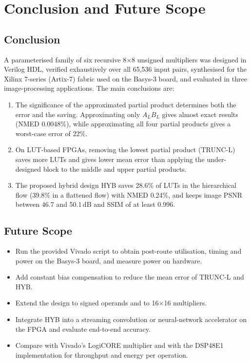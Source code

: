 \documentclass[12pt,a4paper,oneside]{report}
\begin{document}
\chapter{Conclusion and Future Scope}

\section{Conclusion}
A parameterised family of six recursive 8$\times$8 unsigned multipliers was designed in Verilog HDL, verified exhaustively over all 65{,}536 input pairs, synthesised for the Xilinx 7-series (Artix-7) fabric used on the Basys-3 board, and evaluated in three image-processing applications. The main conclusions are:
\begin{enumerate}
\item The significance of the approximated partial product determines both the error and the saving. Approximating only $A_LB_L$ gives almost exact results (NMED 0.0048\%), while approximating all four partial products gives a worst-case error of 22\%.
\item On LUT-based FPGAs, removing the lowest partial product (TRUNC-L) saves more LUTs and gives lower mean error than applying the under-designed block to the middle and upper partial products.
\item The proposed hybrid design HYB saves 28.6\% of LUTs in the hierarchical flow (39.8\% in a flattened flow) with NMED 0.24\%, and keeps image PSNR between 46.7 and 50.1\,dB and SSIM of at least 0.996.
\end{enumerate}

\section{Future Scope}
\begin{itemize}
\item Run the provided Vivado script to obtain post-route utilisation, timing and power on the Basys-3 board, and measure power on hardware.
\item Add constant bias compensation to reduce the mean error of TRUNC-L and HYB.
\item Extend the design to signed operands and to 16$\times$16 multipliers.
\item Integrate HYB into a streaming convolution or neural-network accelerator on the FPGA and evaluate end-to-end accuracy.
\item Compare with Vivado's LogiCORE multiplier and with the DSP48E1 implementation for throughput and energy per operation.
\end{itemize}
\end{document}
